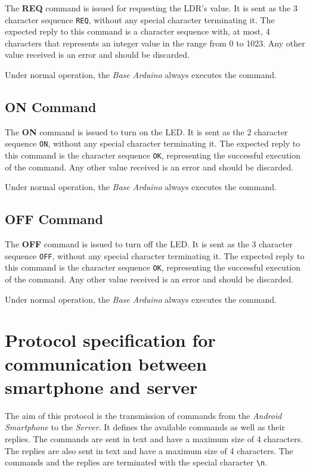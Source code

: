 \documentclass[conference, a4paper]{IEEEtran}
\begin{document}
The \textbf{REQ} command is issued for requesting the LDR's value. It is sent as the 3 character sequence \texttt{REQ}, without any special character terminating it. The expected reply to this command is a character sequence with, at most, 4 characters that represents an integer value in the range from 0 to 1023. Any other value received is an error and should be discarded.

Under normal operation, the \textit{Base Arduino} always executes the command.

\subsection{ON Command}

The \textbf{ON} command is issued to turn on the LED. It is sent as the 2 character sequence \texttt{ON}, without any special character terminating it. The expected reply to this command is the character sequence \texttt{OK}, representing the successful execution of the command. Any other value received is an error and should be discarded.

Under normal operation, the \textit{Base Arduino} always executes the command.

\subsection{OFF Command}

The \textbf{OFF} command is issued to turn off the LED. It is sent as the 3 character sequence \texttt{OFF}, without any special character terminating it. The expected reply to this command is the character sequence \texttt{OK}, representing the successful execution of the command. Any other value received is an error and should be discarded.

Under normal operation, the \textit{Base Arduino} always executes the command.

\section{Protocol specification for communication between smartphone and server}
\label{prot_smart}

The aim of this protocol is the transmission of commands from the \textit{Android Smartphone} to the \textit{Server}. It defines the available commands as well as their replies. The commands are sent in text and have a maximum size of 4 characters. The replies are also sent in text and have a maximum size of 4 characters. The commands and the replies are terminated with the special character \texttt{\textbackslash n}.
\end{document}
